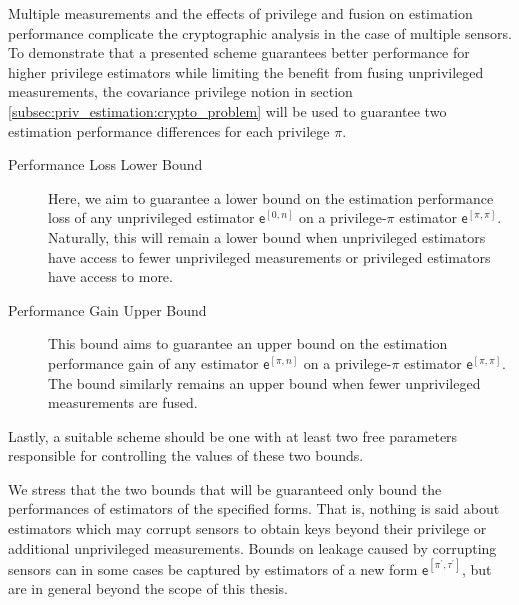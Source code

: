 Multiple measurements and the effects of privilege and fusion on estimation performance complicate the cryptographic analysis in the case of multiple sensors. To demonstrate that a presented scheme guarantees better performance for higher privilege estimators while limiting the benefit from fusing unprivileged measurements, the covariance privilege notion in section \ref{subsec:priv_estimation:crypto_problem} will be used to guarantee two estimation performance differences for each privilege $\pi$.
\begin{description}
  \item[Performance Loss Lower Bound] Here, we aim to guarantee a lower bound on the estimation performance loss of any unprivileged estimator $\mathsf{e}^{[0, n]}$ on a privilege-$\pi$ estimator $\mathsf{e}^{[\pi,\pi]}$. Naturally, this will remain a lower bound when unprivileged estimators have access to fewer unprivileged measurements or privileged estimators have access to more.
  \item[Performance Gain Upper Bound] This bound aims to guarantee an upper bound on the estimation performance gain of any estimator $\mathsf{e}^{[\pi, n]}$ on a privilege-$\pi$ estimator $\mathsf{e}^{[\pi,\pi]}$. The bound similarly remains an upper bound when fewer unprivileged measurements are fused.
\end{description}
Lastly, a suitable scheme should be one with at least two free parameters responsible for controlling the values of these two bounds.
\begin{remark}
  We stress that the two bounds that will be guaranteed only bound the performances of estimators of the specified forms. That is, nothing is said about estimators which may corrupt sensors to obtain keys beyond their privilege or additional unprivileged measurements. Bounds on leakage caused by corrupting sensors can in some cases be captured by estimators of a new form $\mathsf{e}^{[\pi^\prime,\tau^\prime]}$, but are in general beyond the scope of this thesis.
\end{remark}


% 
%                                                                                
%                                                                                
%                                                                                
% 

